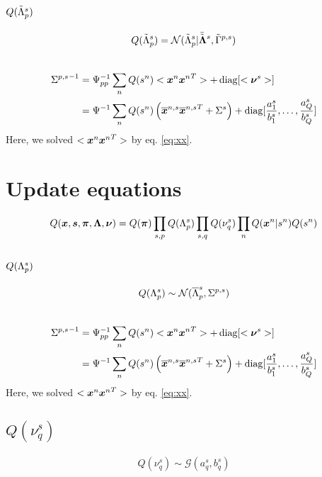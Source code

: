 \documentclass[a4paper]{article}
\begin{document}
\subsection{$Q(\tilde{\Lambda}^s_p)$}
\begin{align}
  Q(\tilde{\Lambda}^s_p)=\mathcal{N}(\tilde{\Lambda}^s_p|\bar{\tilde{\boldsymbol{\Lambda}}}^s,\tilde{\Gamma}^{p,s})
\end{align}

\begin{align}
\end{align}

\begin{align}
  {\Sigma^{p,s}}^{-1}&=\Psi^{-1}_{pp}\sum_n Q(s^n)<\boldsymbol{x}^n {\boldsymbol{x}^n}^T>+\operatorname{diag}[<\boldsymbol{\nu}^s>] \\
    &=\Psi^{-1}\sum_n Q(s^n)\left(\overline{\boldsymbol{x}}^{n,s}{\overline{\boldsymbol{x}}^{n,s}}^T+\Sigma^s\right)+\operatorname{diag}[\frac{a^s_1}{b^s_1},\dots,\frac{a^s_Q}{b^s_Q}]
\end{align}
Here, we solved $<\boldsymbol{x}^n {\boldsymbol{x}^n}^T>$ by eq. \ref{eq:xx}.
 





\section{Update equations}
\begin{align}
  Q(\boldsymbol{x},\boldsymbol{s},\boldsymbol{\pi},\boldsymbol{\Lambda},\boldsymbol{\nu})=Q(\boldsymbol{\pi})\prod_{s,p}Q(\Lambda^s_p)\prod_{s,q}Q(\nu_q^s)\prod_n Q(\boldsymbol{x}^n|s^n)Q(s^n)
\end{align}

\subsection{$Q(\Lambda^s_p)$}
\begin{align}
  Q(\Lambda^s_p)\sim\mathcal{N}(\overline{\Lambda}^s_p,\Sigma^{p,s})
\end{align}

\begin{align}
\end{align}

\begin{align}
  {\Sigma^{p,s}}^{-1}&=\Psi^{-1}_{pp}\sum_n Q(s^n)<\boldsymbol{x}^n {\boldsymbol{x}^n}^T>+\operatorname{diag}[<\boldsymbol{\nu}^s>] \\
    &=\Psi^{-1}\sum_n Q(s^n)\left(\overline{\boldsymbol{x}}^{n,s}{\overline{\boldsymbol{x}}^{n,s}}^T+\Sigma^s\right)+\operatorname{diag}[\frac{a^s_1}{b^s_1},\dots,\frac{a^s_Q}{b^s_Q}]
\end{align}
Here, we solved $<\boldsymbol{x}^n {\boldsymbol{x}^n}^T>$ by eq. \ref{eq:xx}.

\subsection{$Q(\nu_q^s)$}
\begin{align}
 Q(\nu_q^s)\sim\mathcal{G}(a_q^s, b_q^s)
\end{align}
\end{document}
